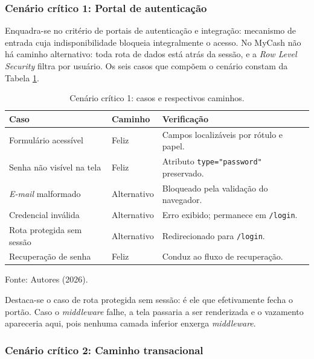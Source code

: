 \documentclass[12pt,a4paper]{article}
\begin{document}
\subsubsection{Cenário crítico 1: Portal de autenticação}

Enquadra-se no critério de portais de autenticação e integração: mecanismo de entrada cuja indisponibilidade bloqueia integralmente o acesso. No MyCash não há caminho alternativo: toda rota de dados está atrás da sessão, e a \textit{Row Level Security} filtra por usuário. Os seis casos que compõem o cenário constam da Tabela \ref{tab:e2e1}.

\begin{table}[H]
\centering
\caption{Cenário crítico 1: casos e respectivos caminhos.}
\label{tab:e2e1}
\renewcommand{\arraystretch}{1.4}
\begin{tabularx}{\textwidth}{@{}>{\RaggedRight}p{5.6cm}>{\centering}p{2.4cm}>{\RaggedRight\arraybackslash}X@{}}
\toprule
\textbf{Caso} & \textbf{Caminho} & \textbf{Verificação} \\
\midrule
Formulário acessível & Feliz & Campos localizáveis por rótulo e papel. \\
Senha não visível na tela & Feliz & Atributo \texttt{type="password"} preservado. \\
\textit{E-mail} malformado & Alternativo & Bloqueado pela validação do navegador. \\
Credencial inválida & Alternativo & Erro exibido; permanece em \texttt{/login}. \\
Rota protegida sem sessão & Alternativo & Redirecionado para \texttt{/login}. \\
Recuperação de senha & Feliz & Conduz ao fluxo de recuperação. \\
\bottomrule
\end{tabularx}
\vspace{0.3cm}

\noindent\footnotesize Fonte: Autores (2026).
\end{table}

Destaca-se o caso de rota protegida sem sessão: é ele que efetivamente fecha o portão. Caso o \textit{middleware} falhe, a tela passaria a ser renderizada e o vazamento apareceria aqui, pois nenhuma camada inferior enxerga \textit{middleware}.

\subsubsection{Cenário crítico 2: Caminho transacional}
\end{document}
